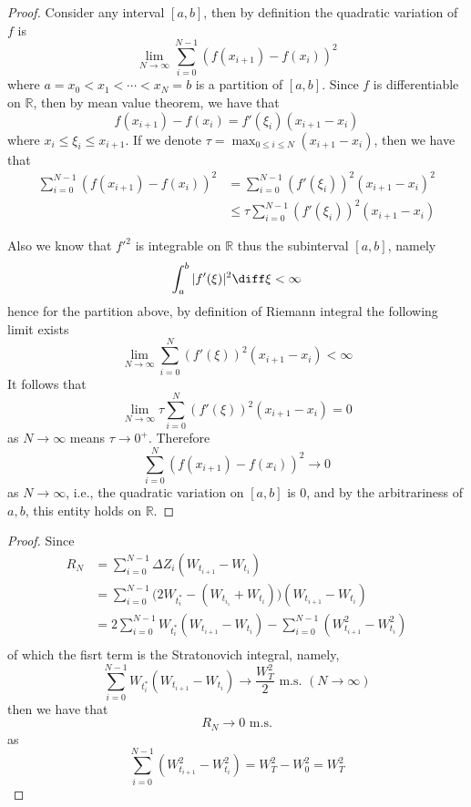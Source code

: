 \newcommand{\var}{\mathrm{Var}}

    \problem
    \begin{proof}
        Consider any interval $[a,b]$, then by definition the
        quadratic variation of $f$ is
        \[\lim_{N\to\infty}\sum_{i=0}^{N-1} (f(x_{i+1})-f(x_i))^2\]
        where $a=x_0<x_1<\cdots<x_N=b$ is a partition of $[a,b]$.
        Since $f$ is differentiable on $\mathbb R$, then by mean
        value theorem, we have that
        \[f(x_{i+1})-f(x_i)=f'(\xi_i)(x_{i+1}-x_i)\]
        where $x_i\leq \xi_i\leq x_{i+1}$.
        If we denote $\tau=\max_{0\leq i\leq N}(x_{i+1}-x_i)$,
        then we have that
        \[\begin{aligned}
            \sum_{i=0}^{N-1}(f(x_{i+1})-f(x_i))^2
            &=\sum_{i=0}^{N-1}(f'(\xi_i))^2(x_{i+1}-x_i)^2\\
            &\leq\tau\sum_{i=0}^{N-1}(f'(\xi_i))^2(x_{i+1}-x_i)
        \end{aligned}\]

        Also we know that $f'^2$ is integrable on $\mathbb R$
        thus the subinterval $[a,b]$, namely
        \[\int_a^b|f'(\xi)|^2\diff\xi<\infty\]
        hence for the partition above, by definition of Riemann
        integral the following limit exists
        \[\lim_{N\to\infty}\sum_{i=0}^N(f'(\xi))^2(x_{i+1}-x_i)
        <\infty\]
        It follows that
        \[\lim_{N\to\infty}\tau\sum_{i=0}^N(f'(\xi))^2(x_{i+1}-x_i)
        =0\]
        as $N\to\infty$ means $\tau\to 0^+$. Therefore
        \[\sum_{i=0}^N(f(x_{i+1})-f(x_i))^2\to 0\]
        as $N\to\infty$, i.e., the quadratic variation on $[a,b]$
        is 0, and by the arbitrariness of $a,b$, this entity holds
        on $\mathbb R$.
    \end{proof}

    \problem
    \begin{proof}
        Since
        \[\begin{aligned}
            R_N&=\sum_{i=0}^{N-1}\Delta Z_i(W_{t_{i+1}}-W_{t_i})\\
            &=\sum_{i=0}^{N-1}\big(2W_{t_i^*}-(W_{t_{i_1}}+W_{t_i})
              \big)(W_{t_{i+1}}-W_{t_i})\\ 
            &=2\sum_{i=0}^{N-1}W_{t^*_i}(W_{t_{i+1}}-W_{t_i})
              -\sum_{i=0}^{N-1}(W_{t_{i+1}}^2-W_{t_i}^2)\\
        \end{aligned}\]
        of which the fisrt term is the Stratonovich integral, namely,
        \[\sum_{i=0}^{N-1}W_{t_i^*}(W_{t_{i+1}}-W_{t_i})\to\frac{W_T^2}{2}
        \text{ m.s. }(N\to\infty)\]
        then we have that
        \[R_N\to 0\text{ m.s.}\]
        as
        \[\sum_{i=0}^{N-1}(W_{t_{i+1}}^2-W_{t_i}^2)=W_T^2-W_0^2=W_T^2\]
    \end{proof}

